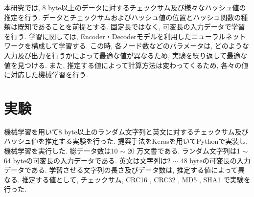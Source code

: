 \documentclass[twocolumn, a4paper]{ieicejsp}
\begin{document}
本研究では, 8 byte以上のデータに対するチェックサム及び様々なハッシュ値の推定を行う.
データとチェックサムおよびハッシュ値の位置とハッシュ関数の種類は既知であることを前提とする.
固定長ではなく, 可変長の入力データで学習を行う.
学習に関しては, Encoder・Decoderモデル\cite{seq2seq}を利用したニューラルネットワークを構成して学習する.
この時, 各ノード数などのパラメータは, どのような入力及び出力を行うかによって最適な値が異なるため, 実験を繰り返して最適な値を見つける.
また, 推定する値によって計算方法は変わってくるため, 各々の値に対応した機械学習を行う.
\section{実験}

機械学習を用いて8 byte以上のランダム文字列と英文に対するチェックサム及びハッシュ値を推定する実験を行った.
提案手法をKerasを用いてPythonで実装し, 機械学習を実行した.
総データ数は10 $\sim$ 20 万文書である.
ランダム文字列は1 $\sim$ 64 byteの可変長の入力データである.
英文は文字列は2 $\sim$ 48 byteの可変長の入力データである.
学習させる文字列の長さ及びデータ数は, 推定する値によって異なる.
推定する値として, チェックサム, CRC16 \cite{crc}, CRC32 \cite{crc}, MD5 \cite{md5}, SHA1 \cite{sha1} で実験を行った.
\end{document}
